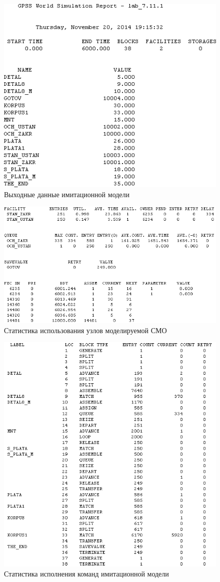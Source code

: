 \begin{figure}[h!]
  \centering
  \includegraphics[width=0.8\linewidth]{pic/report_1}
  \caption{Выходные данные имитационной модели}
  \label{pic:report_1}
\end{figure}

\begin{figure}[h!]
  \centering
  \includegraphics[width=0.8\linewidth]{pic/report_3}
  \caption{Статистика использования узлов моделируемой СМО}
  \label{pic:report_stat}
\end{figure}

\begin{figure}[h!]
  \centering
  \includegraphics[width=1\linewidth]{pic/report_2}
  \caption{Статистика исполнения команд имитационной модели}
  \label{pic:report_2}
\end{figure}

\newpage

